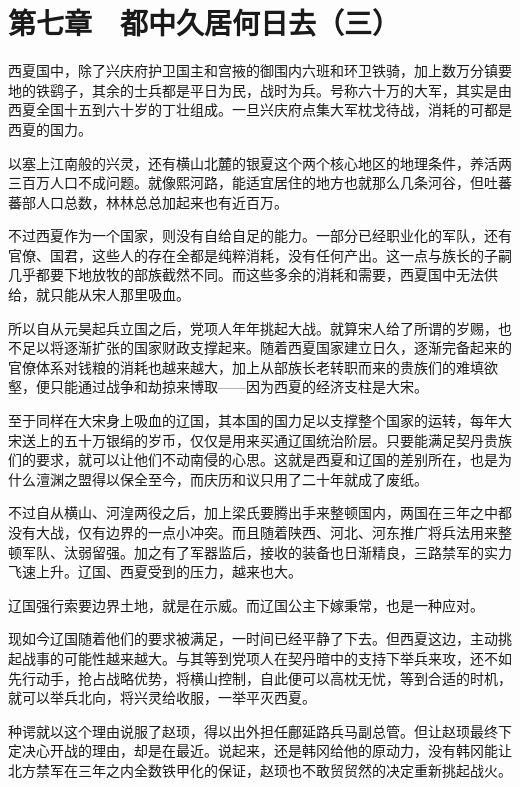 \section{第七章　都中久居何日去（三）}

西夏国中，除了兴庆府护卫国主和宫掖的御围内六班和环卫铁骑，加上数万分镇要地的铁鹞子，其余的士兵都是平日为民，战时为兵。号称六十万的大军，其实是由西夏全国十五到六十岁的丁壮组成。一旦兴庆府点集大军枕戈待战，消耗的可都是西夏的国力。

以塞上江南般的兴灵，还有横山北麓的银夏这个两个核心地区的地理条件，养活两三百万人口不成问题。就像熙河路，能适宜居住的地方也就那么几条河谷，但吐蕃蕃部人口总数，林林总总加起来也有近百万。

不过西夏作为一个国家，则没有自给自足的能力。一部分已经职业化的军队，还有官僚、国君，这些人的存在全都是纯粹消耗，没有任何产出。这一点与族长的子嗣几乎都要下地放牧的部族截然不同。而这些多余的消耗和需要，西夏国中无法供给，就只能从宋人那里吸血。

所以自从元昊起兵立国之后，党项人年年挑起大战。就算宋人给了所谓的岁赐，也不足以将逐渐扩张的国家财政支撑起来。随着西夏国家建立日久，逐渐完备起来的官僚体系对钱粮的消耗也越来越大，加上从部族长老转职而来的贵族们的难填欲壑，便只能通过战争和劫掠来博取——因为西夏的经济支柱是大宋。

至于同样在大宋身上吸血的辽国，其本国的国力足以支撑整个国家的运转，每年大宋送上的五十万银绢的岁币，仅仅是用来买通辽国统治阶层。只要能满足契丹贵族们的要求，就可以让他们不动南侵的心思。这就是西夏和辽国的差别所在，也是为什么澶渊之盟得以保全至今，而庆历和议只用了二十年就成了废纸。

不过自从横山、河湟两役之后，加上梁氏要腾出手来整顿国内，两国在三年之中都没有大战，仅有边界的一点小冲突。而且随着陕西、河北、河东推广将兵法用来整顿军队、汰弱留强。加之有了军器监后，接收的装备也日渐精良，三路禁军的实力飞速上升。辽国、西夏受到的压力，越来也大。

辽国强行索要边界土地，就是在示威。而辽国公主下嫁秉常，也是一种应对。

现如今辽国随着他们的要求被满足，一时间已经平静了下去。但西夏这边，主动挑起战事的可能性越来越大。与其等到党项人在契丹暗中的支持下举兵来攻，还不如先行动手，抢占战略优势，将横山控制，自此便可以高枕无忧，等到合适的时机，就可以举兵北向，将兴灵给收服，一举平灭西夏。

种谔就以这个理由说服了赵顼，得以出外担任鄜延路兵马副总管。但让赵顼最终下定决心开战的理由，却是在最近。说起来，还是韩冈给他的原动力，没有韩冈能让北方禁军在三年之内全数铁甲化的保证，赵顼也不敢贸贸然的决定重新挑起战火。

